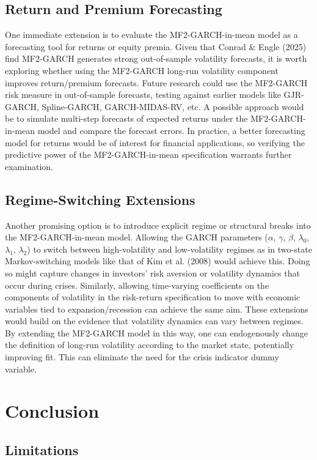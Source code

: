 \documentclass[12pt]{article}
\begin{document}
\subsection{Return and Premium Forecasting}
One immediate extension is to evaluate the MF2-GARCH-in-mean model as a forecasting tool for returns or equity premia. Given that Conrad \& Engle (2025) find MF2-GARCH generates strong out-of-sample volatility forecasts, it is worth exploring whether using the MF2-GARCH long-run volatility component improves return/premium forecasts. Future research could use the MF2-GARCH risk measure in out-of-sample forecasts, testing against earlier models like GJR-GARCH, Spline-GARCH, GARCH-MIDAS-RV, etc. A possible approach would be to simulate multi-step forecasts of expected returns under the MF2-GARCH-in-mean model and compare the forecast errors. In practice, a better forecasting model for returns would be of interest for financial applications, so verifying the predictive power of the MF2-GARCH-in-mean specification warrants further examination.
\subsection{Regime-Switching Extensions}
Another promising option is to introduce explicit regime or structural breaks into the MF2-GARCH-in-mean model. Allowing the GARCH parameters ($\alpha$, $\gamma$, $\beta$, $\lambda_0$, $\lambda_1$, $\lambda_2$) to switch between high-volatility and low-volatility regimes as in two-state Markov-switching models like that of Kim et al. (2008) would achieve this. Doing so might capture changes in investors' risk aversion or volatility dynamics that occur during crises. Similarly, allowing time-varying coefficients on the components of volatility in the risk-return specification to move with economic variables tied to expansion/recession can achieve the same aim. These extensions would build on the evidence that volatility dynamics can vary between regimes. By extending the MF2-GARCH model in this way, one can  endogenously change the definition of long-run volatility according to the market state, potentially improving fit. This can eliminate the need for the crisis indicator dummy variable.

\section{Conclusion}
\subsection{Limitations}
\end{document}
